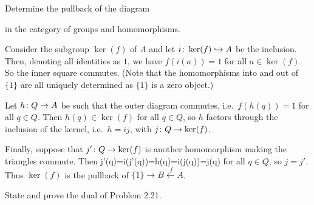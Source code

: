 \bx
Determine the pullback of the diagram
\bse
{}
\ese
in the category of groups and homomorphisms.
\ex

\bs
Consider the subgroup $\ker (f)$ of $A$ and let $i\colon \ker (f)\hookrightarrow A$ be the inclusion. Then, denoting all identities as $1$, we have $f(i(a))=1$ for all $a\in \ker(f)$. So the inner square commutes. (Note that the homomorphisms into and out of $\{1\}$ are all uniquely determined as $\{1\}$ is a zero object.)
\bse
{}
\ese
Let $h\colon Q\to A$ be such that the outer diagram commutes, i.e.\ $f(h(q))=1$ for all $q\in Q$. Then $h(q)\in\ker(f)$ for all $q\in Q$, so $h$ factors through the inclusion of the kernel, i.e.\ $h=ij$, with $j\colon Q\to \ker (f)$. 

Finally, suppose that $j'\colon Q\to \ker(f)$ is another homomorphism making the triangles commute. Then
\bse
j'(q)=i(j'(q))=h(q)=i(j(q))=j(q)
\ese
for all $q\in Q$, so $j=j'$. Thus $\ker(f)$ is the pullback of $\{1\}\to B \xleftarrow{\ f}A$.
\es

\bp
State and prove the dual of Problem 2.21.
\ep

